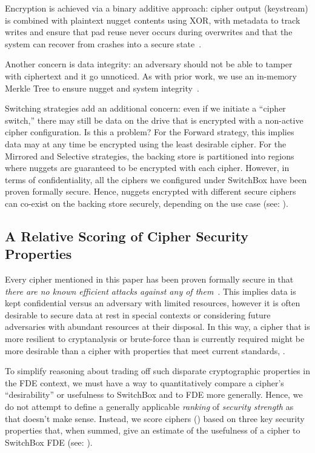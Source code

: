 Encryption is achieved via a binary additive approach: cipher output (keystream)
is combined with plaintext nugget contents using XOR, with metadata to track
writes and ensure that pad reuse never occurs during overwrites and that the
system can recover from crashes into a secure state~\cite{StrongBox}.

Another concern is data integrity: an adversary should not be able to tamper
with ciphertext and it go unnoticed. As with prior work, we use an in-memory
Merkle Tree to ensure nugget and system integrity~\cite{StrongBox}.

Switching strategies add an additional concern: even if we initiate a ``cipher
switch,'' there may still be data on the drive that is encrypted with a
non-active cipher configuration. Is this a problem? For the Forward strategy,
this implies data may at any time be encrypted using the least desirable cipher.
For the Mirrored and Selective strategies, the backing store is partitioned into
regions where nuggets are guaranteed to be encrypted with each cipher. However,
in terms of confidentiality, all the ciphers we configured under SwitchBox have
been proven formally secure. Hence, nuggets encrypted with different secure
ciphers can co-exist on the backing store securely, depending on the use case
(see: ).

\subsection{A Relative Scoring of Cipher Security Properties}

Every cipher mentioned in this paper has been proven formally secure in that
\emph{there are no known efficient attacks against any of them}~\cite{All,
Ciphers, Again}. This implies data is kept confidential versus an adversary with
limited resources, however it is often desirable to secure data at rest in
special contexts or considering future adversaries with abundant resources at
their disposal. In this way, a cipher that is more resilient to cryptanalysis or
brute-force than is currently required might be more desirable than a cipher
with properties that meet current standards, .

To simplify reasoning about trading off such disparate cryptographic properties
in the FDE context, we must have a way to quantitatively compare a cipher's
``desirability'' or usefulness to SwitchBox and to FDE more generally. Hence, we
do not attempt to define a generally applicable \textit{ranking} of
\emph{security strength} as that doesn't make sense. Instead, we score ciphers
() based on three key security properties
that, when summed, give an estimate of the usefulness of a cipher to SwitchBox
FDE (see: ).

